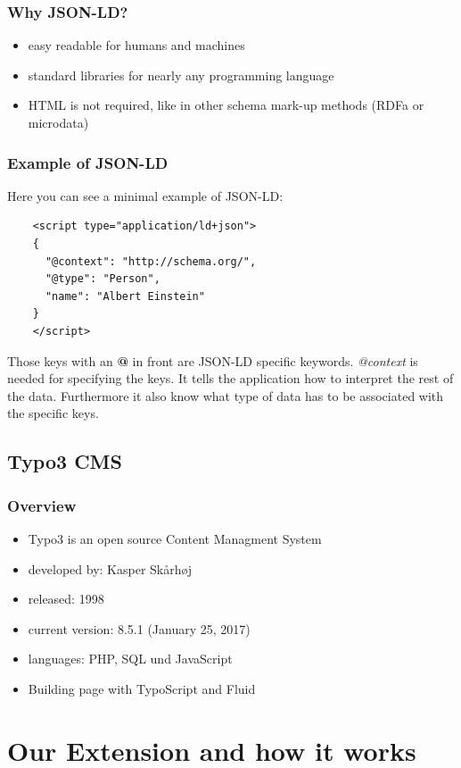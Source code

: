 \documentclass{article}
\begin{document}
\subsubsection{Why JSON-LD?}
\begin{itemize}
	\item easy readable for humans and machines
	\item standard libraries for nearly any programming language
	\item HTML is not required, like in other schema mark-up methods (RDFa or microdata)
\end{itemize}

\subsubsection{Example of JSON-LD}
Here you can see a minimal example of JSON-LD:
\begin{lstlisting}
	<script type="application/ld+json">
	{
	  "@context": "http://schema.org/",
	  "@type": "Person",
	  "name": "Albert Einstein"
	}
	</script>
\end{lstlisting}
Those keys with an \textbf{@} in front are JSON-LD specific keywords. \emph{@context} is needed for specifying the keys. It tells the application how to interpret the rest of the data. Furthermore it also know what type of data has to be associated with the specific keys.
	


\subsection{Typo3 CMS}
\subsubsection{Overview}
\begin{itemize}
	\item Typo3 is an open source Content Managment System
	\item developed by: Kasper Skårhøj
	\item released: 1998
	\item current version: 8.5.1 (January 25, 2017)
	\item languages: PHP, SQL und JavaScript
	\item Building page with TypoScript and Fluid
\end{itemize}


\section{Our Extension and how it works}
\end{document}
